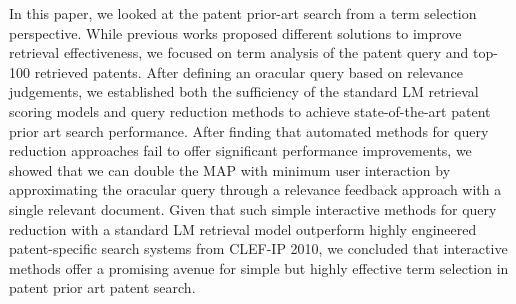 In this paper, we looked at the patent prior-art search from a term
selection perspective.  While previous works proposed different
solutions to improve retrieval effectiveness, we focused on term
analysis of the patent query and top-100 retrieved patents.  After
defining an oracular query based on relevance judgements, we
established both the sufficiency of the standard LM retrieval scoring
models and query reduction methods to achieve state-of-the-art patent
prior art search performance.  After finding that automated methods
for query reduction approaches fail to offer significant performance
improvements,
we showed that we can double the MAP with minimum user interaction by
approximating the oracular query through a relevance feedback approach
with a single relevant document.  Given that such simple interactive
methods for query reduction with a standard LM retrieval model
outperform highly engineered patent-specific search systems from
CLEF-IP 2010, we concluded that interactive methods offer a promising
avenue for simple but highly effective term selection in patent prior
art patent search.




